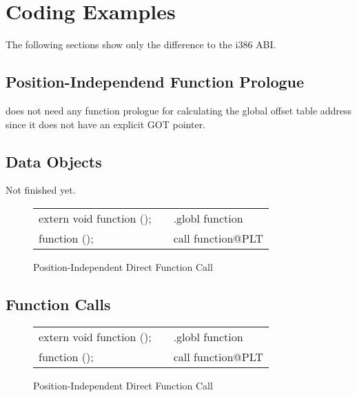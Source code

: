 \section{Coding Examples}

The following sections show only the difference to the i386 ABI.

\subsection{Position-Independend Function Prologue}

\xARCH does not need any function prologue for calculating the global
offset table address since it does not have an explicit GOT pointer.

\subsection{Data Objects}

Not finished yet.

\begin{figure}[H]
\caption{Position-Independent Direct Function Call}
\begin{center}
\begin{tabular}{|l|c|l|}
\cline{1-1}\cline{3-3}
extern void function ();  &&.globl function\\
function ();              &&call function@PLT\\
\cline{1-1}\cline{3-3}
\end{tabular}
\end{center}
\end{figure}

\subsection{Function Calls}

\begin{figure}[H]
\caption{Position-Independent Direct Function Call}
\begin{center}
\begin{tabular}{|l|c|l|}
\cline{1-1}\cline{3-3}
extern void function ();  &&.globl function\\
function ();              &&call function@PLT\\
\cline{1-1}\cline{3-3}
\end{tabular}
\end{center}
\end{figure}

